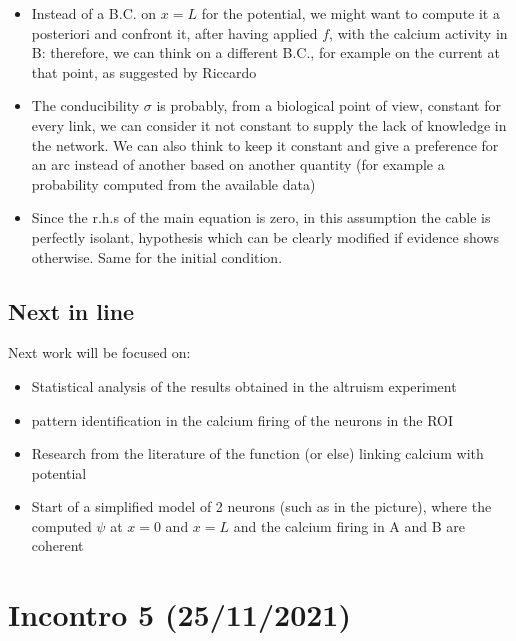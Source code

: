 \documentclass[a4paper]{article}
\begin{document}
	\begin{itemize}
		
		\item Instead of a B.C. on $x=L$ for the potential, we might want to compute it a posteriori and confront it, after having applied $f$, with the calcium activity in B: therefore, we can think on a different B.C., for example on the current at that point, as suggested by Riccardo
		
		\item The conducibility $\sigma$ is probably, from a biological point of view, constant for every link, we can consider it not constant to supply the lack of knowledge in the network. We can also think to keep it constant and give a preference for an arc instead of another based on another quantity (for example a probability computed from the available data)
		
		\item Since the r.h.s of the main equation is zero, in this assumption the cable is perfectly isolant, hypothesis which can be clearly modified if evidence shows otherwise. Same for the initial condition.
	\end{itemize}
	
	\subsection{Next in line}
	
	Next work will be focused on:
	
	\begin{itemize}
		
		\item Statistical analysis of the results obtained in the altruism experiment
		
		\item pattern identification in the calcium firing of the neurons in the ROI
		
		\item Research from the literature of the function (or else) linking calcium with potential
		
		\item Start of a simplified model of 2 neurons (such as in the picture), where the computed $\psi$ at $x = 0 $ and $ x = L$ and the calcium firing in A and B are coherent
	\end{itemize}
	
	\newpage
	
	\section{Incontro 5 (25/11/2021)}
	
\end{document}
